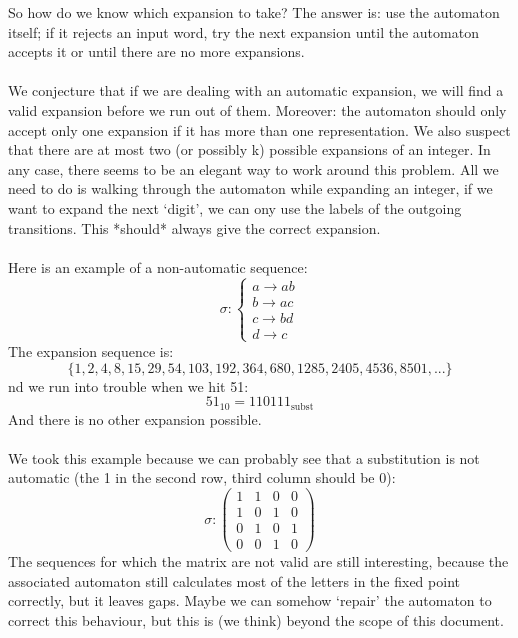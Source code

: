 \documentclass{article}
\begin{document}
So how do we know which expansion to take? The answer is: use the automaton
itself; if it rejects an input word, try the next expansion until the
automaton accepts it or until there are no more expansions.\\
\\
We conjecture that if we are dealing with an automatic expansion, we will
find a valid expansion before we run out of them.
Moreover: the automaton should only accept only one expansion if it has more
than one representation.
We also suspect that there are at most two (or possibly k) possible expansions
of an integer.
In any case, there seems to be an elegant way to work around this problem.
All we need to do is walking through the automaton while expanding an integer,
if we want to expand the next `digit', we can ony use the labels of the
outgoing transitions. This *should* always give the correct expansion.\\
\\
Here is an example of a non-automatic sequence:
\begin{displaymath}
\sigma: \left\{ \begin{array}{l}
a \rightarrow ab\\
b \rightarrow ac\\
c \rightarrow bd\\
d \rightarrow c
\end{array} \right.
\end{displaymath}
The expansion sequence is:
\begin{displaymath}
\{1, 2, 4, 8, 15, 29, 54, 103, 192, 364, 680, 1285, 2405, 4536, 8501, ... \}
\end{displaymath}
nd we run into trouble when we hit 51:
\begin{displaymath}
51_{10} = 110111_{\mathrm{subst}}
\end{displaymath}
And there is no other expansion possible.\\
\\
We took this example because we can probably see that a substitution is not
automatic (the 1 in the second row, third column should be 0):
\begin{displaymath}
\sigma: \left( \begin{array}{cccc}
1 & 1 & 0 & 0 \\
1 & 0 & 1 & 0 \\
0 & 1 & 0 & 1 \\
0 & 0 & 1 & 0
\end{array} \right)
\end{displaymath}
The sequences for which the matrix are not valid are still interesting, because
the associated automaton still calculates most of the letters in the fixed
point correctly, but it leaves gaps.
Maybe we can somehow `repair' the automaton to correct this behaviour, but
this is (we think) beyond the scope of this document.
\end{document}
